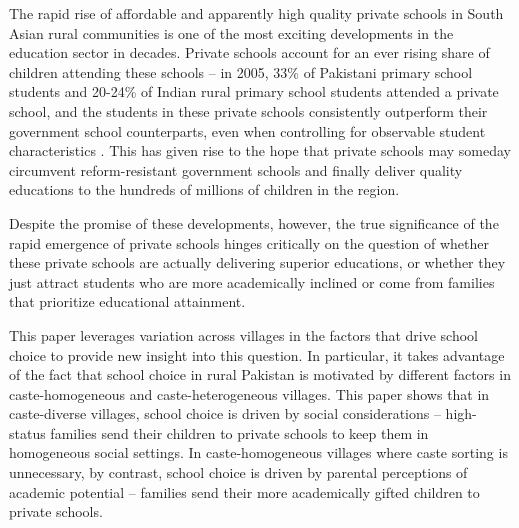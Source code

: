 \documentclass[Eubank_pk_ethnic_sorting.tex]{subfiles}
\begin{document}
The rapid rise of affordable and apparently high quality private schools in South Asian rural communities is one of the most exciting developments in the education sector in decades. Private schools account for an ever rising share of children attending these schools -- in 2005, 33\% of Pakistani primary school students and 20-24\% of Indian rural primary school students attended a private school, and the students in these private schools consistently outperform their government school counterparts, even when controlling for observable student characteristics \citep{Jimenez:1991wa, Jimenez:1995vg, Pratham:2005vw, Andrabi:2011hl, Desai:2009ty, Tooley:2003vf, Alderman:2003we, Alderman:2001wk}. This has given rise to the hope that private schools may someday circumvent reform-resistant government schools and finally deliver quality educations to the hundreds of millions of children in the region.

Despite the promise of these developments, however, the true significance of the rapid emergence of private schools hinges critically on the question of whether these private schools are actually delivering superior educations, or whether they just attract students who are more academically inclined or come from families that prioritize educational attainment. 

This paper leverages variation across villages in the factors that drive school choice to provide new insight into this question. In particular, it takes advantage of the fact that school choice in rural Pakistan is motivated by different factors in caste-homogeneous and caste-heterogeneous villages. This paper shows that in caste-diverse villages, school choice is driven by social considerations -- high-status families send their children to private schools to keep them in homogeneous social settings. In caste-homogeneous villages where caste sorting is unnecessary, by contrast, school choice is driven by parental perceptions of academic potential -- families send their more academically gifted children to private schools. 
\end{document}
